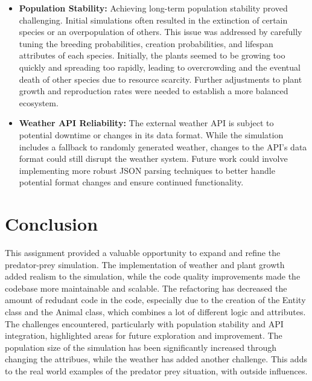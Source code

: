 \documentclass{article}
\begin{document}
\begin{itemize}
    \item \textbf{Population Stability:} Achieving long-term population stability proved challenging. Initial simulations often resulted in the extinction of certain species or an overpopulation of others. This issue was addressed by carefully tuning the breeding probabilities, creation probabilities, and lifespan attributes of each species. Initially, the plants seemed to be growing too quickly and spreading too rapidly, leading to overcrowding and the eventual death of other species due to resource scarcity. Further adjustments to plant growth and reproduction rates were needed to establish a more balanced ecosystem.
    \item \textbf{Weather API Reliability:} The external weather API is subject to potential downtime or changes in its data format. While the simulation includes a fallback to randomly generated weather, changes to the API's data format could still disrupt the weather system. Future work could involve implementing more robust JSON parsing techniques to better handle potential format changes and ensure continued functionality.
\end{itemize}

\section{Conclusion}

This assignment provided a valuable opportunity to expand and refine the predator-prey simulation. The implementation of weather and plant growth added realism to the simulation, while the code quality improvements made the codebase more maintainable and scalable. The refactoring has decreased the amount of redudant code in the code, especially due to the creation of the Entity class and the Animal class, which combines a lot of different logic and attributes. The challenges encountered, particularly with population stability and API integration, highlighted areas for future exploration and improvement. The population size of the simulation has been significantly increased through changing the attribues, while the weather has added another challenge. This adds to the real world examples of the predator prey situation, with outside influences.
\end{document}
